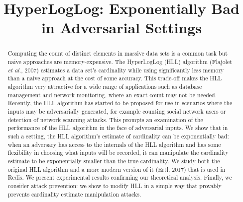 \documentclass{article}
\title{HyperLogLog: Exponentially Bad in Adversarial Settings}
\begin{document}
\maketitle

\begin{abstract}
Computing the count of distinct elements in massive data sets is a common task but naive approaches are memory-expensive. The HyperLogLog (HLL) algorithm (Flajolet \emph{et al.}, 2007) estimates a data set's cardinality while using significantly less memory than a naive approach at the cost of some accuracy. This trade-off makes the HLL algorithm very attractive for a wide range of applications such as database management and network monitoring, where an exact count may not be needed. Recently, the HLL algorithm has started to be proposed for use in scenarios where the inputs may be adversarially generated, for example counting social network users or detection of network scanning attacks. This prompts an examination of the performance of the HLL algorithm in the face of adversarial inputs. We show that in such a setting, the HLL algorithm's estimate of cardinality can be exponentially bad: when an adversary has access to the internals of the HLL algorithm and has some flexibility in choosing what inputs will be recorded, it can manipulate the cardinality estimate to be exponentially smaller than the true cardinality. We study both the original HLL algorithm and a more modern version of it (Ertl, 2017) that is used in Redis. We present experimental results confirming our theoretical analysis. Finally, we consider attack prevention: we show to modify HLL in a simple way that provably prevents cardinality estimate manipulation attacks.
\end{abstract}

\end{document}
